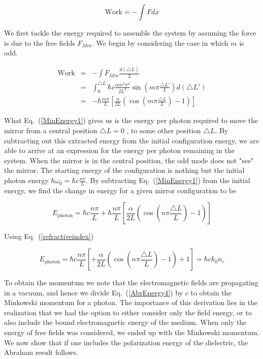 \documentclass[twocolumn,english,pra,aps,superscriptaddress,floatfix]{revtex4-1}
\begin{document}
\begin{equation}
\mathrm{Work}=-\int Fdx
\label{workenergy1}
\end{equation}


We first tackle the energy required to assemble the system by assuming the force is due to the free fields $F_{Min}$. We begin by considering the case in which $m$ is odd.

\begin{eqnarray}
\mathrm{Work}&=&-\int F_{Min}\frac{d\left(\triangle L\right)}{2} \nonumber \\
&=&\int_{0}^{\triangle L}\hbar c\frac{\alpha m^{2}\pi^{2}}{2L^{3}}\sin(m\pi\frac{\triangle L'}{L})d\left(\triangle L'\right) \nonumber \\
&=&-\hbar\frac{m\pi}{L}\left[\frac{\alpha}{2L}\left(\cos(m\pi\frac{\triangle L}{L})-1\right)\right]
\label{MinEnergy1}
\end{eqnarray}

What Eq.\ (\ref{MinEnergy1}) gives us is the energy per photon required to move the mirror from a central position $\triangle L=0$ , to some other position $\triangle L$.  By subtracting out this extracted energy from the initial configuration energy, we are able to arrive at an expression for the energy per photon remaining in the system.  When the mirror is in the central position, the odd mode does not "see" the mirror. The starting energy of the configuration is nothing but the initial photon energy $\hbar\omega_{0}=\hbar c\frac{n\pi}{L}$.  By subtracting Eq.\ (\ref{MinEnergy1}) from the initial energy, we find the change in energy for a given mirror configuration to be


\begin{equation}
E_{\mathrm{photon}}=\hbar c\frac{n\pi}{L}+\hbar\frac{n\pi}{L}\left[\frac{\alpha}{2L}\left(\cos(n\pi\frac{\triangle L}{L})-1\right)\right]
\label{MinEnergy2}
\end{equation}

Using Eq.\ (\ref{refractiveindex})

\begin{equation}
E_{\mathrm{photon}}=\hbar c\frac{n\pi}{L}\left[+\frac{\alpha}{2L}\left(\cos(n\pi\frac{\triangle L}{L})-1\right)+1\right]=\hbar ck_{0}n_{r}
\label{AbrEnergy4}
\end{equation}


To obtain the momentum we note that the electromagnetic fields are propagating in a vacuum, and hence we divide Eq.\ (\ref{AbrEnergy4}) by $c$ to obtain the Minkowski momentum for a photon. The
importance of this derivation lies in the realization that we had the option
to either consider only the field energy, or to also include the bound electromagnetic energy of the medium. When only the energy of free fields was considered,
we ended up with the Minkowski momentum. We now show that if
one includes the polarization energy of the dielectric, the Abraham result follows.
\end{document}
